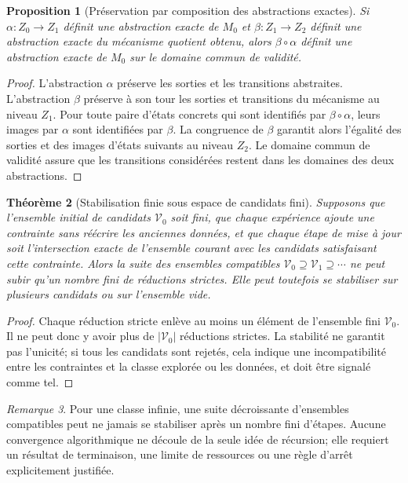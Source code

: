 \documentclass[11pt,oneside]{book}
\newtheorem{theoreme}{Théorème}[chapter]
\newtheorem{proposition}[theoreme]{Proposition}
\theoremstyle{definition}
\theoremstyle{remark}
\newtheorem{remarque}[theoreme]{Remarque}
\newcommand{\1}{\mathbf 1}
\begin{document}
\begin{proposition}[Préservation par composition des abstractions exactes]
Si $\alpha:Z_0\to Z_1$ définit une abstraction exacte de $M_0$ et $\beta:Z_1\to Z_2$ définit une abstraction exacte du mécanisme quotient obtenu, alors $\beta\circ\alpha$ définit une abstraction exacte de $M_0$ sur le domaine commun de validité.
\end{proposition}
\begin{proof}
L'abstraction $\alpha$ préserve les sorties et les transitions abstraites. L'abstraction $\beta$ préserve à son tour les sorties et transitions du mécanisme au niveau $Z_1$. Pour toute paire d'états concrets qui sont identifiés par $\beta\circ\alpha$, leurs images par $\alpha$ sont identifiées par $\beta$. La congruence de $\beta$ garantit alors l'égalité des sorties et des images d'états suivants au niveau $Z_2$. Le domaine commun de validité assure que les transitions considérées restent dans les domaines des deux abstractions.\end{proof}

\begin{theoreme}[Stabilisation finie sous espace de candidats fini]
Supposons que l'ensemble initial de candidats $\mathcal V_0$ soit fini, que chaque expérience ajoute une contrainte sans réécrire les anciennes données, et que chaque étape de mise à jour soit l'intersection exacte de l'ensemble courant avec les candidats satisfaisant cette contrainte. Alors la suite des ensembles compatibles $\mathcal V_0\supseteq\mathcal V_1\supseteq\cdots$ ne peut subir qu'un nombre fini de réductions strictes. Elle peut toutefois se stabiliser sur plusieurs candidats ou sur l'ensemble vide.
\end{theoreme}
\begin{proof}
Chaque réduction stricte enlève au moins un élément de l'ensemble fini $\mathcal V_0$. Il ne peut donc y avoir plus de $|\mathcal V_0|$ réductions strictes. La stabilité ne garantit pas l'unicité; si tous les candidats sont rejetés, cela indique une incompatibilité entre les contraintes et la classe explorée ou les données, et doit être signalé comme tel.\end{proof}

\begin{remarque}
Pour une classe infinie, une suite décroissante d'ensembles compatibles peut ne jamais se stabiliser après un nombre fini d'étapes. Aucune convergence algorithmique ne découle de la seule idée de récursion; elle requiert un résultat de terminaison, une limite de ressources ou une règle d'arrêt explicitement justifiée.
\end{remarque}
\end{document}
